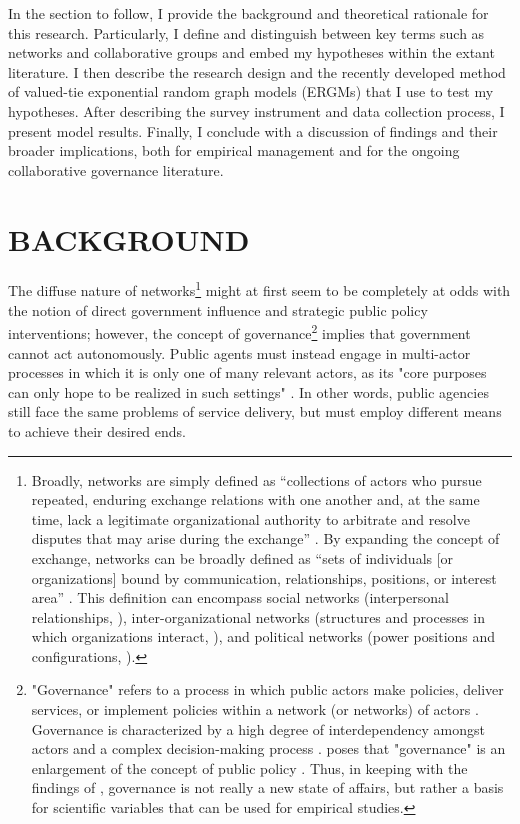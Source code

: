 \documentclass[12pt,a4paper,titlepage]{article}
\begin{document}
In the section to follow, I provide the background and theoretical rationale for this research. Particularly, I define and distinguish between key terms such as networks and collaborative groups and embed my hypotheses within the extant literature. I then describe the research design and the recently developed method of valued-tie exponential random graph models (ERGMs) \parencite{krivitsky2012, krivitsky2013,cranmer2011,desmarais2012-a,wyatt2009,wyatt2010} that I use to test my hypotheses. After describing the survey instrument and data collection process, I present model results. Finally, I conclude with a discussion of findings and their broader implications, both for empirical management and for the ongoing collaborative governance literature.

\section{\bf\MakeUppercase{Background}}

The diffuse nature of networks\footnote{Broadly, networks are simply defined as “collections of actors who pursue repeated, enduring exchange relations with one another and, at the same time, lack a legitimate organizational authority to arbitrate and resolve disputes that may arise during the exchange” \parencite[59]{podolny1998}. By expanding the concept of exchange, networks can be broadly defined as “sets of individuals [or organizations] bound by communication, relationships, positions, or interest area” \parencite[33]{margerum2011}. This definition can encompass social networks (interpersonal relationships, \cite{putnam2000}), inter-organizational networks (structures and processes in which organizations interact, \cite{alexander1993}), and political networks (power positions and configurations, \cite{knoke1990}).} might at first seem to be completely at odds with the notion of direct government influence and strategic public policy interventions; however, the concept of governance\footnote{"Governance" refers to a process in which public actors make policies, deliver services, or implement policies within a network (or networks) of actors \parencite{frederickson2005,rhodes1997,torfing2007}. Governance is characterized by a high degree of interdependency amongst actors and a complex decision-making process \parencite{klijn2010}. \textcite[125]{bressers2009} poses that "governance" is an enlargement of the concept of public policy \parencite[also][]{bressers2003}. Thus, in keeping with the findings of \textcite{ostrom1961}, governance is not really a new state of affairs, but rather a basis for scientific variables that can be used for empirical studies.} implies that government cannot act autonomously. Public agents must instead engage in multi-actor processes in which it is only one of many relevant actors, as its "core purposes can only hope to be realized in such settings" \parencite[130]{bressers2009}. In other words, public agencies still face the same problems of service delivery, but must employ different means to achieve their desired ends.
\end{document}
